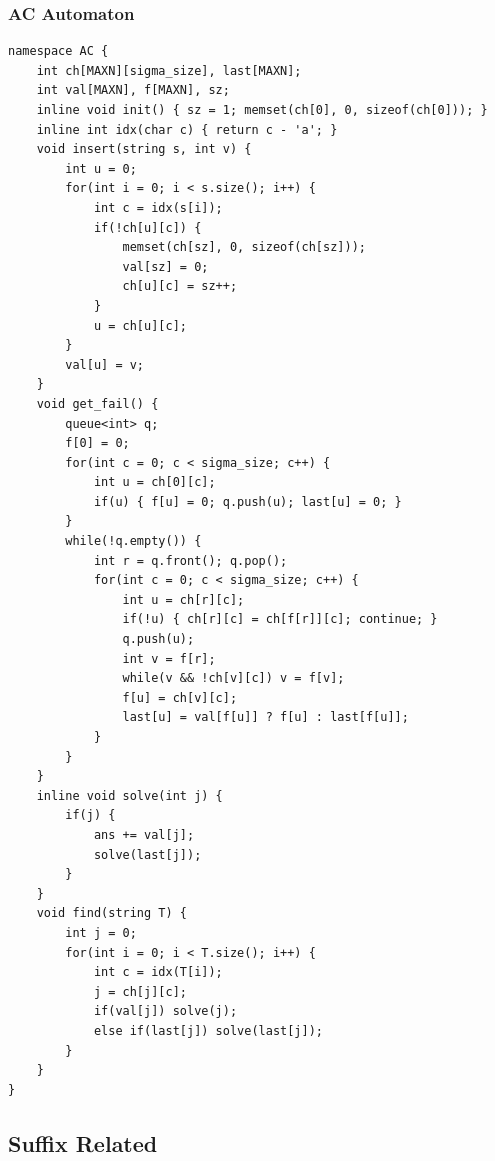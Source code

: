 \documentclass[10pt]{ctexart}
\begin{document}
{\subsubsection{AC Automaton}
\begin{lstlisting}
namespace AC {
    int ch[MAXN][sigma_size], last[MAXN];
    int val[MAXN], f[MAXN], sz;
    inline void init() { sz = 1; memset(ch[0], 0, sizeof(ch[0])); }
    inline int idx(char c) { return c - 'a'; }
    void insert(string s, int v) {
        int u = 0;
        for(int i = 0; i < s.size(); i++) {
            int c = idx(s[i]);
            if(!ch[u][c]) {
                memset(ch[sz], 0, sizeof(ch[sz]));
                val[sz] = 0;
                ch[u][c] = sz++;
            }
            u = ch[u][c];
        }
        val[u] = v;
    }
    void get_fail() {
        queue<int> q;
        f[0] = 0;
        for(int c = 0; c < sigma_size; c++) {
            int u = ch[0][c];
            if(u) { f[u] = 0; q.push(u); last[u] = 0; }
        }
        while(!q.empty()) {
            int r = q.front(); q.pop();
            for(int c = 0; c < sigma_size; c++) {
                int u = ch[r][c];
                if(!u) { ch[r][c] = ch[f[r]][c]; continue; }
                q.push(u);
                int v = f[r];
                while(v && !ch[v][c]) v = f[v];
                f[u] = ch[v][c];
                last[u] = val[f[u]] ? f[u] : last[f[u]];
            }
        }
    }
    inline void solve(int j) {
        if(j) {
            ans += val[j];
            solve(last[j]);
        }
    }
    void find(string T) {
        int j = 0;
        for(int i = 0; i < T.size(); i++) {
            int c = idx(T[i]);
            j = ch[j][c];
            if(val[j]) solve(j);
            else if(last[j]) solve(last[j]);
        }
    }
}
\end{lstlisting}
\subsection{Suffix Related}
}
\end{document}
